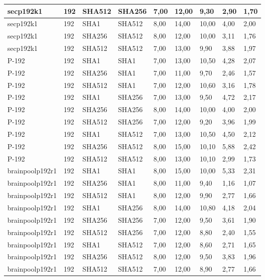 \begin{longtable}{| l | l | l | l | l |l |l |l |l |}
secp192k1 & 192 & SHA512 & SHA256 & 7,00 & 12,00 & 9,30 & 2,90 & 1,70 \\ \hline 
secp192k1 & 192 & SHA1 & SHA512 & 8,00 & 14,00 & 10,00 & 4,00 & 2,00 \\ \hline 
secp192k1 & 192 & SHA256 & SHA512 & 8,00 & 12,00 & 10,00 & 3,11 & 1,76 \\ \hline 
secp192k1 & 192 & SHA512 & SHA512 & 7,00 & 13,00 & 9,90 & 3,88 & 1,97 \\ \hline 
P-192 & 192 & SHA1 & SHA1 & 7,00 & 13,00 & 10,50 & 4,28 & 2,07 \\ \hline 
P-192 & 192 & SHA256 & SHA1 & 7,00 & 11,00 & 9,70 & 2,46 & 1,57 \\ \hline 
P-192 & 192 & SHA512 & SHA1 & 7,00 & 12,00 & 10,60 & 3,16 & 1,78 \\ \hline 
P-192 & 192 & SHA1 & SHA256 & 7,00 & 13,00 & 9,50 & 4,72 & 2,17 \\ \hline 
P-192 & 192 & SHA256 & SHA256 & 8,00 & 14,00 & 10,00 & 4,00 & 2,00 \\ \hline 
P-192 & 192 & SHA512 & SHA256 & 7,00 & 12,00 & 9,20 & 3,96 & 1,99 \\ \hline 
P-192 & 192 & SHA1 & SHA512 & 7,00 & 13,00 & 10,50 & 4,50 & 2,12 \\ \hline 
P-192 & 192 & SHA256 & SHA512 & 8,00 & 15,00 & 10,10 & 5,88 & 2,42 \\ \hline 
P-192 & 192 & SHA512 & SHA512 & 8,00 & 13,00 & 10,10 & 2,99 & 1,73 \\ \hline 
brainpoolp192r1 & 192 & SHA1 & SHA1 & 8,00 & 15,00 & 10,00 & 5,33 & 2,31 \\ \hline 
brainpoolp192r1 & 192 & SHA256 & SHA1 & 8,00 & 11,00 & 9,40 & 1,16 & 1,07 \\ \hline 
brainpoolp192r1 & 192 & SHA512 & SHA1 & 8,00 & 12,00 & 9,90 & 2,77 & 1,66 \\ \hline 
brainpoolp192r1 & 192 & SHA1 & SHA256 & 8,00 & 14,00 & 10,80 & 4,18 & 2,04 \\ \hline 
brainpoolp192r1 & 192 & SHA256 & SHA256 & 7,00 & 12,00 & 9,50 & 3,61 & 1,90 \\ \hline 
brainpoolp192r1 & 192 & SHA512 & SHA256 & 7,00 & 12,00 & 8,80 & 2,40 & 1,55 \\ \hline 
brainpoolp192r1 & 192 & SHA1 & SHA512 & 7,00 & 12,00 & 8,60 & 2,71 & 1,65 \\ \hline 
brainpoolp192r1 & 192 & SHA256 & SHA512 & 8,00 & 12,00 & 9,50 & 3,83 & 1,96 \\ \hline 
brainpoolp192r1 & 192 & SHA512 & SHA512 & 7,00 & 12,00 & 8,90 & 2,77 & 1,66 \\ \hline 

\end{longtable}
